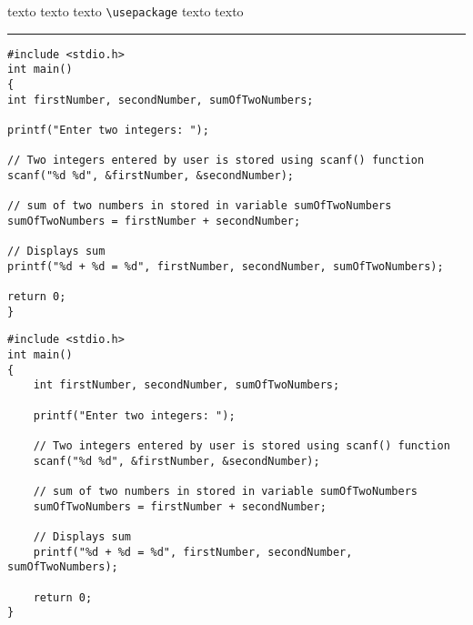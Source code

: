 \documentclass{article}
\begin{document}
\newpage
	
texto texto texto \lstinline|\usepackage| texto texto 

\rule{7cm}{5mm}

\begin{lstlisting}[float=t,belowskip=3cm]
#include <stdio.h>
int main()
{
int firstNumber, secondNumber, sumOfTwoNumbers;

printf("Enter two integers: ");

// Two integers entered by user is stored using scanf() function
scanf("%d %d", &firstNumber, &secondNumber);

// sum of two numbers in stored in variable sumOfTwoNumbers
sumOfTwoNumbers = firstNumber + secondNumber;

// Displays sum      
printf("%d + %d = %d", firstNumber, secondNumber, sumOfTwoNumbers);

return 0;
}
\end{lstlisting}









%
	
\newpage	

\begin{verbatim}
#include <stdio.h>
int main()
{
	int firstNumber, secondNumber, sumOfTwoNumbers;
	
	printf("Enter two integers: ");
	
	// Two integers entered by user is stored using scanf() function
	scanf("%d %d", &firstNumber, &secondNumber);
	
	// sum of two numbers in stored in variable sumOfTwoNumbers
	sumOfTwoNumbers = firstNumber + secondNumber;
	
	// Displays sum      
	printf("%d + %d = %d", firstNumber, secondNumber, sumOfTwoNumbers);
	
	return 0;
}	
\end{verbatim}	
\end{document}
